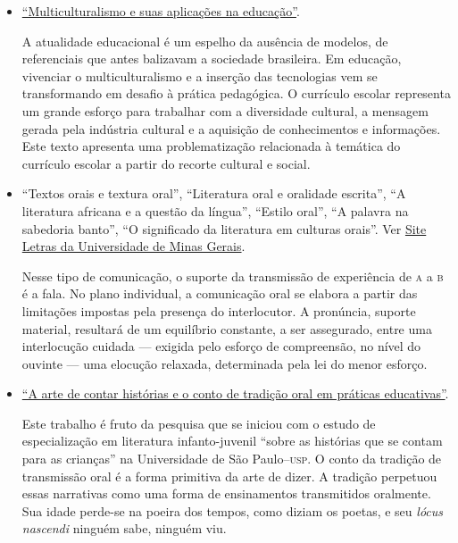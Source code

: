\documentclass[11pt]{extarticle}
\begin{document}
\begin{itemize}
\item \href{educacaopublica.cecierj.edu.br/artigos/19/1/multiculturalismo-e-suas-implicaes-na-educao}{``Multiculturalismo e suas aplicações na educação''}.

	A atualidade educacional é um espelho da ausência de modelos, de referenciais que antes balizavam a sociedade brasileira. Em educação, vivenciar o multiculturalismo e a inserção das tecnologias vem se transformando em desafio à prática pedagógica. O currículo escolar representa um grande esforço para trabalhar com a diversidade cultural, a mensagem gerada pela indústria cultural e a aquisição de conhecimentos e informações. Este texto apresenta uma problematização relacionada à temática do currículo escolar a partir do recorte cultural e social.

	\item ``Textos orais e textura oral'', ``Literatura oral e oralidade escrita'', ``A literatura africana e a questão da língua'', ``Estilo oral'', ``A palavra na sabedoria banto'', ``O significado da literatura em culturas orais''. Ver \href{letras.ufmg.br/padrao_cms/documentos/eventos/vivavoz/A\%20tradi\%C3\%A7\%C3\%A3o\%20oral_diagramado_16jun2016.pdf}{Site Letras da Universidade de Minas Gerais}. 

	Nesse tipo de comunicação, o suporte da transmissão de experiência
de \textsc{a} a \textsc{b} é a fala. No plano individual, a comunicação oral se elabora
a partir das limitações impostas pela presença do interlocutor. A pronúncia, suporte material, 
resultará de um equilíbrio constante, a ser assegurado, entre uma interlocução cuidada --- 
exigida pelo esforço de compreensão, no nível do ouvinte --- uma elocução relaxada,
determinada pela lei do menor esforço.

\item \href{pepsic.bvsalud.org/scielo.php?script=sci_arttext&pid=S1415-69542013000100004}{``A arte de contar histórias e o conto de tradição oral em práticas educativas''}. 

Este trabalho é fruto da pesquisa que se iniciou com o estudo de especialização em literatura infanto-juvenil ``sobre as histórias que se contam para as crianças'' na Universidade de São Paulo--\textsc{usp}. O conto da tradição de transmissão oral é a forma primitiva da arte de dizer. A tradição perpetuou essas narrativas como uma forma de ensinamentos transmitidos oralmente. Sua idade perde-se na poeira dos tempos, como diziam os poetas, e seu \textit{lócus nascendi} ninguém sabe, ninguém viu.

\end{itemize}
\end{document}
